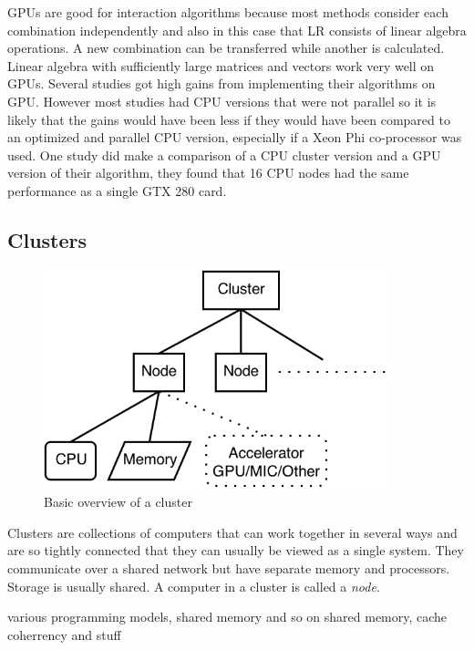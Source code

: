 \documentclass[10pt,a4paper]{report}
\begin{document}
GPUs are good for interaction algorithms because most methods consider each combination independently and also in this case that LR consists of linear algebra operations. A new combination can be transferred while another is calculated. Linear algebra with sufficiently large matrices and vectors work very well on GPUs\cite{cublas, cuda}. Several studies got high gains from implementing their algorithms on GPU\cite{gwis,gboost,gmdr_gpu,cuda_lr,genie_2012,plink_gpu}. However most studies had CPU versions that were not parallel so it is likely that the gains would have been less if they would have been compared to an optimized and parallel CPU version, especially if a Xeon Phi co-processor was used. One study did make a comparison of a CPU cluster version and a GPU version of their algorithm, they found that 16 CPU nodes had the same performance as a single GTX 280 card\cite{jiang_accelerating}.

\subsection{Clusters}
\label{clusers}

\begin{figure}[h]
    \centering
    \includegraphics[width=10cm]{Cluster.png}
    \caption{Basic overview of a cluster}
    \label{fig:cluster}
\end{figure}

Clusters are collections of computers that can work together in several ways and are so tightly connected that they can usually be viewed as a single system. They communicate over a shared network but have separate memory and processors. Storage is usually shared. A computer in a cluster is called a \emph{node}. \cite{intro_hpc, introduction_hpc_hager}

various programming models, shared memory and so on
shared memory, cache coherrency and stuff
\end{document}
